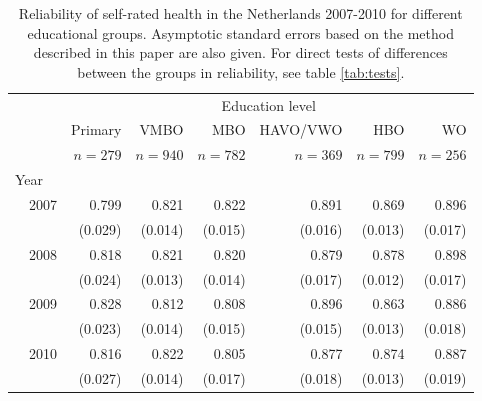 \documentclass[a4paper, 11pt]{article}
\newcommand{\0}{\boldsymbol{0}}
\begin{document}
\begin{table}[ht]
\begin{center}
\begin{tabular}{lrrrrrrr}
  \hline  \hline
&  &\multicolumn{6}{c}{Education level}\\\cline{3-8}
&	&	Primary		&VMBO		&		MBO	&HAVO/VWO&	HBO	&	WO	\\	
&	&	$n=279$		&$n=940$	&		$n=782$	&$n=369$	&	$n=799$	&	$n=256$	\\	
                                                                                  
	\hline              
\multicolumn{2}{l}{Year}\\                                                      
&	2007	&	0.799	&	0.821	&		0.822	&0.891	&	0.869	&	0.896	\\	
&		&	(0.029)	&	(0.014)	&		(0.015)	&(0.016)	&	(0.013)	&	(0.017)	\vspace{7pt}\\	
                                                                                  
&	2008	&	0.818	&	0.821	&		0.820	&0.879	&	0.878	&	0.898	\\	
&		&	(0.024)	&	(0.013)	&		(0.014)	&(0.017)	&	(0.012)	&	(0.017)	\vspace{7pt}\\	
	                                                                          
&	2009	&	0.828	&	0.812	&		0.808	&0.896	&	0.863	&	0.886	\\	
&		&	(0.023)	&	(0.014)	&		(0.015)	&(0.015)	&	(0.013)	&	(0.018)	\vspace{7pt}\\	
	                                                                          
&	2010	&	0.816	&	0.822	&		0.805	&0.877	&	0.874	&	0.887	\\	
&		&	(0.027)	&	(0.014)	&		(0.017)	&(0.018)	&	(0.013)	&	(0.019)	\\	
  \hline     \hline
\end{tabular}
\caption{Reliability of self-rated health in the Netherlands 2007-2010 for different educational groups. 
Asymptotic standard errors based on the method described in this paper are also given. For direct tests of 
differences between the groups in reliability, see table \ref{tab:tests}.}\label{tab:health-education}
\end{center}
\end{table}
\end{document}
